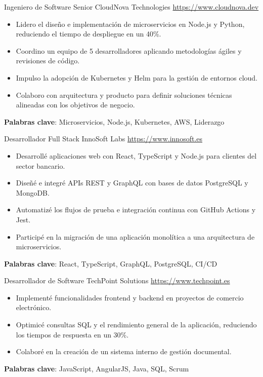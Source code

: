 \documentclass[a4paper, serif, 10pt]{moderncv}
\begin{document}
        {Ingeniero de Software Senior}
        {CloudNova Technologies}
        {\url{https://www.cloudnova.dev}}
        {}
        {\begin{itemize}
\item Lidero el diseño e implementación de microservicios en Node.js y Python, reduciendo el tiempo de despliegue en un 40\%.
\item Coordino un equipo de 5 desarrolladores aplicando metodologías ágiles y revisiones de código.
\item Impulso la adopción de Kubernetes y Helm para la gestión de entornos cloud.
\item Colaboro con arquitectura y producto para definir soluciones técnicas alineadas con los objetivos de negocio.
\end{itemize}
\textbf{Palabras clave}: Microservicios, Node.js, Kubernetes, AWS, Liderazgo}

        {Desarrollador Full Stack}
        {InnoSoft Labs}
        {\url{https://www.innosoft.es}}
        {}
        {\begin{itemize}
\item Desarrollé aplicaciones web con React, TypeScript y Node.js para clientes del sector bancario.
\item Diseñé e integré APIs REST y GraphQL con bases de datos PostgreSQL y MongoDB.
\item Automatizé los flujos de prueba e integración continua con GitHub Actions y Jest.
\item Participé en la migración de una aplicación monolítica a una arquitectura de microservicios.
\end{itemize}
\textbf{Palabras clave}: React, TypeScript, GraphQL, PostgreSQL, CI/CD}

        {Desarrollador de Software}
        {TechPoint Solutions}
        {\url{https://www.techpoint.es}}
        {}
        {\begin{itemize}
\item Implementé funcionalidades frontend y backend en proyectos de comercio electrónico.
\item Optimicé consultas SQL y el rendimiento general de la aplicación, reduciendo los tiempos de respuesta en un 30\%.
\item Colaboré en la creación de un sistema interno de gestión documental.
\end{itemize}
\textbf{Palabras clave}: JavaScript, AngularJS, Java, SQL, Scrum}
\end{document}
